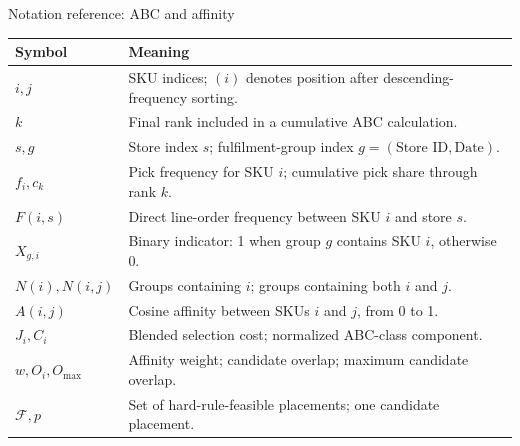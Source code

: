 \documentclass[aspectratio=169,10pt]{beamer}
\begin{document}
\begin{frame}{Notation reference: ABC and affinity}
  \small
  \begin{tabular}{@{}p{}p{}@{}}
    \toprule
    \textbf{Symbol} & \textbf{Meaning}\\
    \midrule
    $i,j$ & SKU indices; $(i)$ denotes position after descending-frequency sorting.\\
    $k$ & Final rank included in a cumulative ABC calculation.\\
    $s,g$ & Store index $s$; fulfilment-group index $g=(\text{Store ID},\text{Date})$.\\
    $f_i,c_k$ & Pick frequency for SKU $i$; cumulative pick share through rank $k$.\\
    $F(i,s)$ & Direct line-order frequency between SKU $i$ and store $s$.\\
    $X_{g,i}$ & Binary indicator: 1 when group $g$ contains SKU $i$, otherwise 0.\\
    $N(i),N(i,j)$ & Groups containing $i$; groups containing both $i$ and $j$.\\
    $A(i,j)$ & Cosine affinity between SKUs $i$ and $j$, from 0 to 1.\\
    $J_i,C_i$ & Blended selection cost; normalized ABC-class component.\\
    $w,O_i,O_{\max}$ & Affinity weight; candidate overlap; maximum candidate overlap.\\
    $\mathcal{F},p$ & Set of hard-rule-feasible placements; one candidate placement.\\
    \bottomrule
  \end{tabular}
\end{frame}
\end{document}
